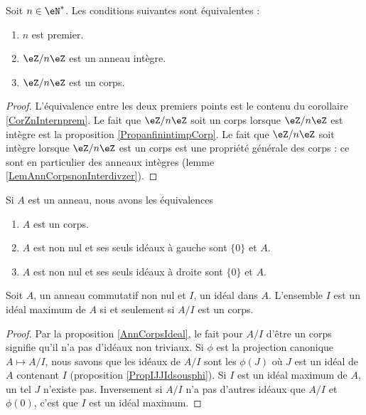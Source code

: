 \begin{proposition}     \label{PropzhFgNJ}
    Soit \( n\in\eN^*\). Les conditions suivantes sont équivalentes :
    \begin{enumerate}
        \item
            \( n\) est premier.
        \item
            \( \eZ/n\eZ\) est un anneau intègre.
        \item
            \( \eZ/n\eZ\) est un corps.
    \end{enumerate}
\end{proposition}

\begin{proof}
    L'équivalence entre les deux premiers points est le contenu du corollaire \ref{CorZnInternprem}. Le fait que \( \eZ/n\eZ\) soit un corps lorsque \( \eZ/n\eZ\) est intègre est la proposition \ref{PropanfinintimpCorp}. Le fait que \( \eZ/n\eZ\) soit intègre lorsque \( \eZ/n\eZ\) est un corps est une propriété générale des corps : ce sont en particulier des anneaux intègres (lemme \ref{LemAnnCorpsnonInterdivzer}).
\end{proof}

\begin{proposition}     \label{AnnCorpsIdeal}
    Si \( A\) est un anneau, nous avons les équivalences
    \begin{enumerate}
        \item
            \( A\) est un corps.
        \item
            \( A\) est non nul et ses seuls idéaux à gauche sont \( \{ 0 \}\) et \( A\).
        \item
            \( A\) est non nul et ses seuls idéaux à droite sont \( \{ 0 \}\) et \( A\).
    \end{enumerate}
\end{proposition}

\begin{proposition}
    Soit \( A\), un anneau commutatif non nul et \( I\), un idéal dans \( A\). L'ensemble \( I\) est un idéal maximum de \( A\) si et seulement si \( A/I\) est un corps.
\end{proposition}

\begin{proof}
    Par la proposition \ref{AnnCorpsIdeal}, le fait pour \( A/I\) d'être un corps signifie qu'il n'a pas d'idéaux non triviaux. Si \( \phi\) est la projection canonique \( A\mapsto A/I\), nous savons que les idéaux de \( A/I\) sont les \( \phi(J)\) où \( J\) est un idéal de \( A\) contenant \( I\) (proposition \ref{PropIJJIdsousphi}). Si \( I\) est un idéal maximum de \( A\), un tel \( J\) n'existe pas. Inversement si \( A/I\) n'a pas d'autres idéaux que \( A/I\) et \( \phi(0)\), c'est que \( I\) est un idéal maximum.
\end{proof}

